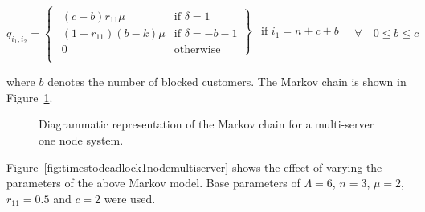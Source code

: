 \documentclass{article}
\numberwithin{equation}{section}
\begin{document}
\begin{equation}\label{eqn:1msB}
  q_{i_1, i_2} = \left\{
  \begin{array}{rr}
    \left. \begin{array}{rr}
      (c-b)r_{11}\mu & \text{if } \delta = 1 \\
      (1-r_{11})(b-k)\mu & \text{if } \delta = -b-1\\
      0 & \text{otherwise}
    \end{array} \right\} & \text{if } i_1 = n + c + b \\
  \end{array} \right.
  \quad \forall \quad 0 \leq b \leq c
\end{equation}

where $b$ denotes the number of blocked customers.
The Markov chain is shown in Figure~\ref{fig:1nodeMCms}.

\begin{figure}[!htbp]
    \begin{center}
    
    \end{center}
    \caption{Diagrammatic representation of the Markov chain for a
    multi-server one node system.}
    \label{fig:1nodeMCms}
\end{figure}

Figure~\ref{fig:timestodeadlock1nodemultiserver} shows the effect of varying
the parameters of the above Markov model.
Base parameters of $\Lambda = 6$, $n = 3$, $\mu = 2$, $r_{11} = 0.5$ and
$c = 2$ were used.
\end{document}
